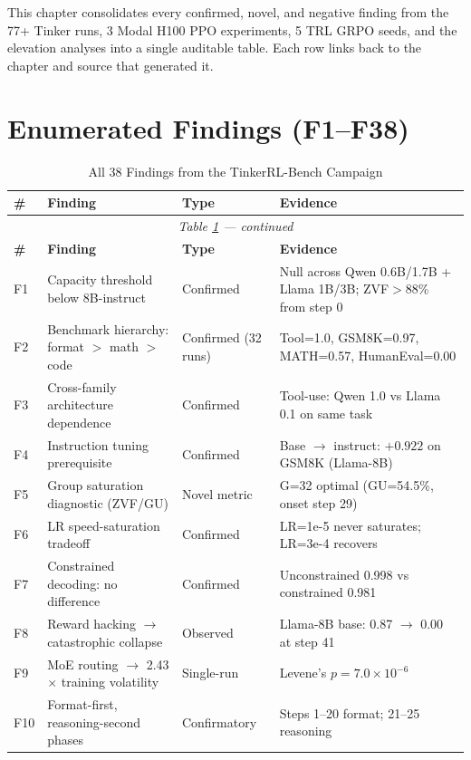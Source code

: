 \documentclass[12pt,a4paper]{report}
\theoremstyle{definition}
\begin{document}
This chapter consolidates every confirmed, novel, and negative finding from the 77+ Tinker runs, 3 Modal
H100 PPO experiments, 5 TRL GRPO seeds, and the elevation analyses into a single auditable table. Each
row links back to the chapter and source that generated it.

\section{Enumerated Findings (F1--F38)}
\label{sec:findings-enum}

\begin{small}
\begin{longtable}{p{0.5cm}p{7cm}p{2.3cm}p{4.5cm}}
\caption{All 38 Findings from the TinkerRL-Bench Campaign}
\label{tab:all-findings}\\
\toprule
\textbf{\#} & \textbf{Finding} & \textbf{Type} & \textbf{Evidence} \\
\midrule
\endfirsthead
\multicolumn{4}{c}{\emph{Table \ref{tab:all-findings} --- continued}}\\
\toprule
\textbf{\#} & \textbf{Finding} & \textbf{Type} & \textbf{Evidence} \\
\midrule
\endhead
\bottomrule
\endfoot
F1 & Capacity threshold below 8B-instruct & Confirmed & Null across Qwen 0.6B/1.7B + Llama 1B/3B; ZVF$>$88\% from step 0 \\
F2 & Benchmark hierarchy: format $>$ math $>$ code & Confirmed (32 runs) & Tool=1.0, GSM8K=0.97, MATH=0.57, HumanEval=0.00 \\
F3 & Cross-family architecture dependence & Confirmed & Tool-use: Qwen 1.0 vs Llama 0.1 on same task \\
F4 & Instruction tuning prerequisite & Confirmed & Base $\to$ instruct: $+0.922$ on GSM8K (Llama-8B) \\
F5 & Group saturation diagnostic (ZVF/GU) & Novel metric & G=32 optimal (GU=54.5\%, onset step 29) \\
F6 & LR speed-saturation tradeoff & Confirmed & LR=1e-5 never saturates; LR=3e-4 recovers \\
F7 & Constrained decoding: no difference & Confirmed & Unconstrained 0.998 vs constrained 0.981 \\
F8 & Reward hacking $\to$ catastrophic collapse & Observed & Llama-8B base: 0.87 $\to$ 0.00 at step 41 \\
F9 & MoE routing $\to$ 2.43$\times$ training volatility & Single-run & Levene's $p=7.0 \times 10^{-6}$ \\
F10 & Format-first, reasoning-second phases & Confirmatory & Steps 1--20 format; 21--25 reasoning \\

\end{longtable}
\end{small}
\end{document}
